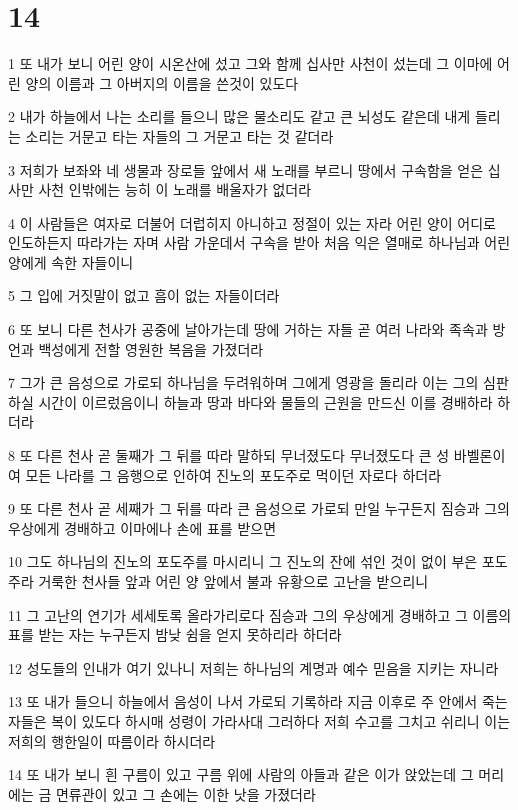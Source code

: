 \chapter{14}

\par 1 또 내가 보니 어린 양이 시온산에 섰고 그와 함께 십사만 사천이 섰는데 그 이마에 어린 양의 이름과 그 아버지의 이름을 쓴것이 있도다
\par 2 내가 하늘에서 나는 소리를 들으니 많은 물소리도 같고 큰 뇌성도 같은데 내게 들리는 소리는 거문고 타는 자들의 그 거문고 타는 것 같더라
\par 3 저희가 보좌와 네 생물과 장로들 앞에서 새 노래를 부르니 땅에서 구속함을 얻은 십 사만 사천 인밖에는 능히 이 노래를 배울자가 없더라
\par 4 이 사람들은 여자로 더불어 더럽히지 아니하고 정절이 있는 자라 어린 양이 어디로 인도하든지 따라가는 자며 사람 가운데서 구속을 받아 처음 익은 열매로 하나님과 어린 양에게 속한 자들이니
\par 5 그 입에 거짓말이 없고 흠이 없는 자들이더라
\par 6 또 보니 다른 천사가 공중에 날아가는데 땅에 거하는 자들 곧 여러 나라와 족속과 방언과 백성에게 전할 영원한 복음을 가졌더라
\par 7 그가 큰 음성으로 가로되 하나님을 두려워하며 그에게 영광을 돌리라 이는 그의 심판하실 시간이 이르렀음이니 하늘과 땅과 바다와 물들의 근원을 만드신 이를 경배하라 하더라
\par 8 또 다른 천사 곧 둘째가 그 뒤를 따라 말하되 무너졌도다 무너졌도다 큰 성 바벨론이여 모든 나라를 그 음행으로 인하여 진노의 포도주로 먹이던 자로다 하더라
\par 9 또 다른 천사 곧 세째가 그 뒤를 따라 큰 음성으로 가로되 만일 누구든지 짐승과 그의 우상에게 경배하고 이마에나 손에 표를 받으면
\par 10 그도 하나님의 진노의 포도주를 마시리니 그 진노의 잔에 섞인 것이 없이 부은 포도주라 거룩한 천사들 앞과 어린 양 앞에서 불과 유황으로 고난을 받으리니
\par 11 그 고난의 연기가 세세토록 올라가리로다 짐승과 그의 우상에게 경배하고 그 이름의 표를 받는 자는 누구든지 밤낮 쉼을 얻지 못하리라 하더라
\par 12 성도들의 인내가 여기 있나니 저희는 하나님의 계명과 예수 믿음을 지키는 자니라
\par 13 또 내가 들으니 하늘에서 음성이 나서 가로되 기록하라 지금 이후로 주 안에서 죽는 자들은 복이 있도다 하시매 성령이 가라사대 그러하다 저희 수고를 그치고 쉬리니 이는 저희의 행한일이 따름이라 하시더라
\par 14 또 내가 보니 흰 구름이 있고 구름 위에 사람의 아들과 같은 이가 앉았는데 그 머리에는 금 면류관이 있고 그 손에는 이한 낫을 가졌더라
